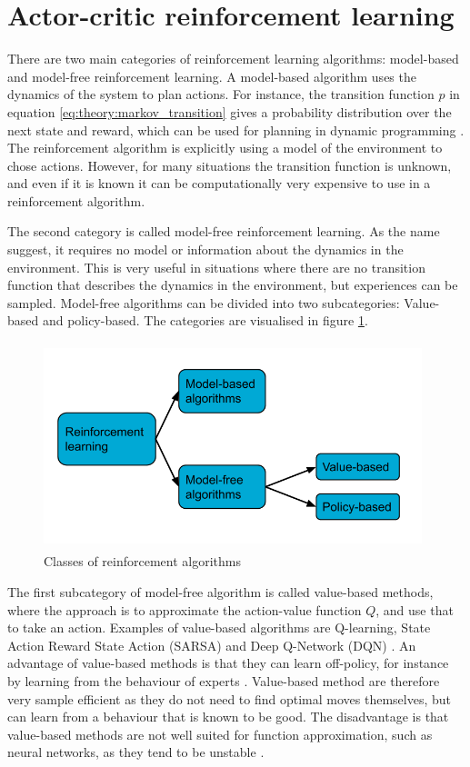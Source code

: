 \documentclass[class=book, crop=false, 11pt]{standalone}
\begin{document}
\section{Actor-critic reinforcement learning}
There are two main categories of reinforcement learning algorithms: model-based and model-free reinforcement learning. A model-based algorithm uses the dynamics of the system to plan actions. For instance, the transition function $p$ in equation \eqref{eq:theory:markov_transition}  gives a probability distribution over the next state and reward, which can be used for planning in dynamic programming \cite{silver_course}. The reinforcement algorithm is explicitly using a model of the environment to chose actions. However, for many situations the transition function is unknown, and even if it is known it can be computationally very expensive to use in a reinforcement algorithm.

The second category is called model-free reinforcement learning. As the name suggest, it requires no model or information about the dynamics in the environment. This is very useful in situations where there are no transition function that describes the dynamics in the environment, but experiences can be sampled. Model-free algorithms can be divided into two subcategories: Value-based and policy-based. The categories are visualised in figure \ref{fig:theory:rl_model_modelfree}.


\begin{figure}[ht!]
    \center
    \includegraphics[height=6cm, width=11cm]{figures/rl_model_modelfree.png}
    \caption[size = 9]{Classes of reinforcement algorithms}
    \label{fig:theory:rl_model_modelfree}
\end{figure}


The first subcategory of model-free algorithm is called value-based methods, where the approach is to approximate the action-value function $Q$, and use that to take an action. Examples of value-based algorithms are Q-learning, State Action Reward State Action (SARSA) and Deep Q-Network (DQN) \cite{Sutton1998}. An advantage of value-based methods is that they can learn off-policy, for instance by learning from the behaviour of experts \cite{value_based_policy_Nachum}. Value-based method are therefore very sample efficient as they do not need to find optimal moves themselves, but can learn from a behaviour that is known to be good. The disadvantage is that value-based methods are not well suited for function approximation, such as neural networks, as they tend to be unstable \cite{Sutton1998}. 
\end{document}
